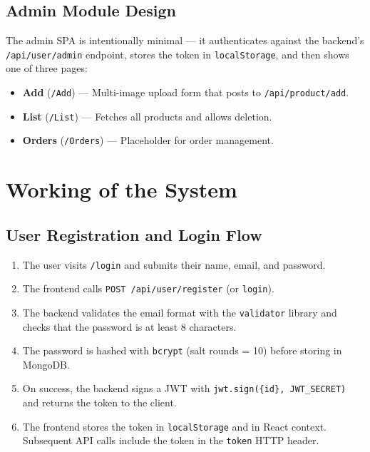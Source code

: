\documentclass[12pt,a4paper]{report}
\begin{document}
\section{Admin Module Design}

The admin SPA is intentionally minimal — it authenticates against the backend's
\texttt{/api/user/admin} endpoint, stores the token in \texttt{localStorage}, and then shows one
of three pages:

\begin{itemize}[leftmargin=*]
  \item \textbf{Add} (\texttt{/Add}) — Multi-image upload form that posts to
        \texttt{/api/product/add}.
  \item \textbf{List} (\texttt{/List}) — Fetches all products and allows deletion.
  \item \textbf{Orders} (\texttt{/Orders}) — Placeholder for order management.
\end{itemize}

\chapter{Working of the System}

\section{User Registration and Login Flow}

\begin{enumerate}[leftmargin=*, label=\arabic*.]
  \item The user visits \texttt{/login} and submits their name, email, and password.
  \item The frontend calls \texttt{POST /api/user/register} (or \texttt{login}).
  \item The backend validates the email format with the \texttt{validator} library and checks that
        the password is at least 8 characters.
  \item The password is hashed with \texttt{bcrypt} (salt rounds = 10) before storing in MongoDB.
  \item On success, the backend signs a JWT with \texttt{jwt.sign(\{id\}, JWT\_SECRET)} and returns
        the token to the client.
  \item The frontend stores the token in \texttt{localStorage} and in React context.
        Subsequent API calls include the token in the \texttt{token} HTTP header.
\end{enumerate}
\end{document}
